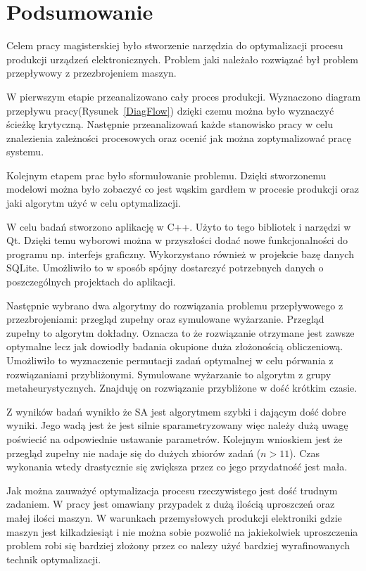 \chapter{Podsumowanie}

Celem pracy magisterskiej było stworzenie narzędzia do optymalizacji procesu produkcji urządzeń elektronicznych. Problem jaki należało rozwiązać był problem przepływowy z przezbrojeniem maszyn.

W pierwszym etapie przeanalizowano cały proces produkcji. Wyznaczono diagram przepływu pracy(Rysunek~\ref{DiagFlow}) dzięki czemu można było wyznaczyć ścieżkę krytyczną. Następnie przeanalizowań każde stanowisko pracy w celu znalezienia zależności procesowych oraz ocenić jak można zoptymalizować pracę systemu.

Kolejnym etapem prac było sformułowanie problemu. Dzięki stworzonemu modelowi można było zobaczyć co jest wąskim gardłem w procesie produkcji oraz jaki algorytm użyć w celu optymalizacji.

W celu badań stworzono aplikację w C++. Użyto to tego bibliotek i narzędzi w Qt. Dzięki temu wyborowi można w przyszłości dodać nowe funkcjonalności do programu np. interfejs graficzny. Wykorzystano również w projekcie bazę danych SQLite. Umożliwiło to w sposób spójny dostarczyć potrzebnych danych o poszczególnych projektach do aplikacji.

Następnie wybrano dwa algorytmy do rozwiązania problemu przepływowego z przezbrojeniami: przegląd zupełny oraz symulowane wyżarzanie. Przegląd zupełny to algorytm dokładny. Oznacza to że rozwiązanie otrzymane jest zawsze optymalne lecz jak dowiodły badania okupione duża złożonością obliczeniową. Umożliwiło to wyznaczenie permutacji zadań optymalnej w celu pórwania z rozwiązaniami przybliżonymi. Symulowane wyżarzanie to algorytm z grupy metaheurystycznych. Znajduję on rozwiązanie przybliżone w dość krótkim czasie.

Z wyników badań wynikło że SA jest algorytmem szybki i dającym dość dobre wyniki. Jego wadą jest że jest silnie sparametryzowany więc należy dużą uwagę poświecić na odpowiednie ustawanie parametrów. Kolejnym wnioskiem jest że przegląd zupełny nie nadaje się do dużych zbiorów zadań ($n>11$). Czas wykonania wtedy drastycznie się zwiększa przez co jego przydatność jest mała.

Jak można zauważyć optymalizacja procesu rzeczywistego jest dość trudnym zadaniem. W pracy jest omawiany przypadek z dużą ilością uproszczeń oraz małej ilości maszyn. W warunkach przemysłowych produkcji elektroniki gdzie maszyn jest kilkadziesiąt i nie można sobie pozwolić na jakiekolwiek uproszczenia problem robi się bardziej złożony przez co nalezy użyć bardziej wyrafinowanych technik optymalizacji.